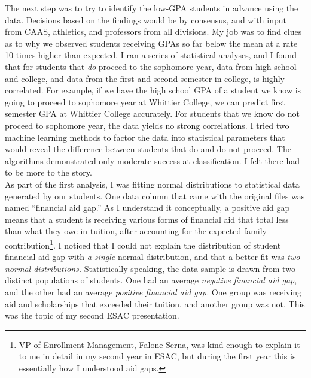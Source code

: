 \documentclass[../../../main.tex]{subfiles}
\begin{document}
The next step was to try to identify the low-GPA students in advance using the data.  Decisions based on the findings would be by consensus, and with input from CAAS, athletics, and professors from all divisions.  My job was to find clues as to why we observed students receiving GPAs so far below the mean at a rate 10 times higher than expected.  I ran a series of statistical analyses, and I found that for students that \textit{do} proceed to the sophomore year, data from high school and college, and data from the first and second semester in college, is highly correlated.  For example, if we have the high school GPA of a student we know is going to proceed to sophomore year at Whittier College, we can predict first semester GPA at Whittier College accurately.  For students that we know do not proceed to sophomore year, the data yields no strong correlations.  I tried two machine learning methods to factor the data into statistical parameters that would reveal the difference between students that do and do not proceed.  The algorithms demonstrated only moderate success at classification. I felt there had to be more to the story.
\\
\vspace{0.15cm}
As part of the first analysis, I was fitting normal distributions to statistical data generated by our students.  One data column that came with the original files was named ``financial aid gap.''  As I understand it conceptually, a positive aid gap means that a student is receiving various forms of financial aid that total less than what they owe in tuition, after accounting for the expected family contribution\footnote{VP of Enrollment Management, Falone Serna, was kind enough to explain it to me in detail in my second year in ESAC, but during the first year this is essentially how I understood aid gaps.}.  I noticed that I could not explain the distribution of student financial aid gap with \textit{a single} normal distribution, and that a better fit was \textit{two normal distributions.}  Statistically speaking, the data sample is drawn from two distinct populations of students.  One had an average \textit{negative financial aid gap}, and the other had an average \textit{positive financial aid gap.}  One group was receiving aid and scholarships that exceeded their tuition, and another group was not.  This was the topic of my second ESAC presentation.
\\
\vspace{0.15cm}
\end{document}
